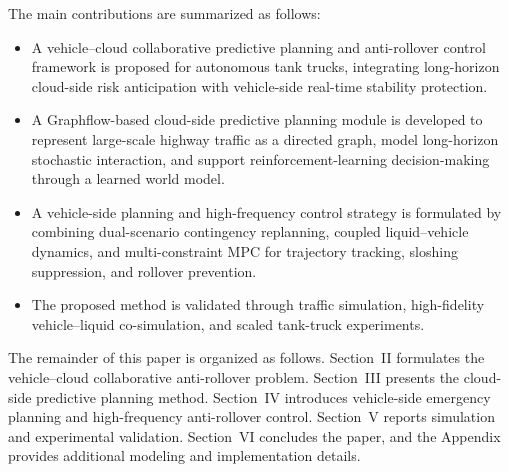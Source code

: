 The main contributions are summarized as follows:
\begin{itemize}
  \item A vehicle--cloud collaborative predictive planning and anti-rollover control framework is proposed for autonomous tank trucks, integrating long-horizon cloud-side risk anticipation with vehicle-side real-time stability protection.
  \item A Graphflow-based cloud-side predictive planning module is developed to represent large-scale highway traffic as a directed graph, model long-horizon stochastic interaction, and support reinforcement-learning decision-making through a learned world model.
  \item A vehicle-side planning and high-frequency control strategy is formulated by combining dual-scenario contingency replanning, coupled liquid--vehicle dynamics, and multi-constraint MPC for trajectory tracking, sloshing suppression, and rollover prevention.
  \item The proposed method is validated through traffic simulation, high-fidelity vehicle--liquid co-simulation, and scaled tank-truck experiments.
\end{itemize}

The remainder of this paper is organized as follows. Section~II formulates the vehicle--cloud collaborative anti-rollover problem. Section~III presents the cloud-side predictive planning method. Section~IV introduces vehicle-side emergency planning and high-frequency anti-rollover control. Section~V reports simulation and experimental validation. Section~VI concludes the paper, and the Appendix provides additional modeling and implementation details.

